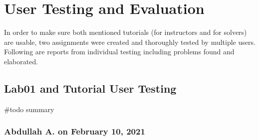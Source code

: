 \chapter{User Testing and Evaluation} \label{chap:usertest}

{In order to make sure both mentioned tutorials (for instructors and for solvers) are usable, two assignments were created and thoroughly tested by multiple users. Following are reports from individual testing including problems found and elaborated.}

\section{Lab01 and Tutorial User Testing}\label{sec:lab01}

{\#todo summary}

\subsection{Abdullah A. on February 10, 2021}\label{ssec:abdullah0210}


